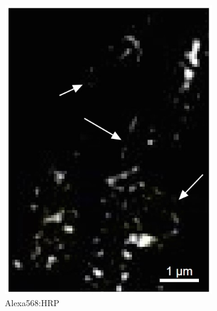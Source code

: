 \begin{figure}
\begin{subfigure}[t]{0.235\textwidth}
		\includegraphics[width=\linewidth]{images/DeepSIM_NMJ_woAO_ROI1_Alexa568.jpg}
		\caption{Alexa568:HRP}
		\label{fig:DeepSIM_NMJ_woAO_ROI1_Alexa568}
	\end{subfigure}
	\begin{subfigure}[t]{0.24\textwidth}
		\centering

\end{subfigure}
\end{figure}
